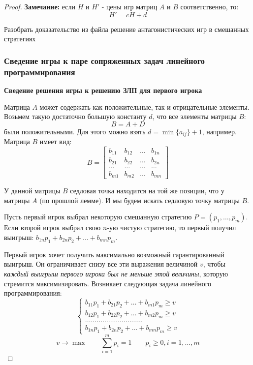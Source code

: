 \documentclass[aps,%
12pt,%
final,%
oneside,
onecolumn,%
musixtex, %
superscriptaddress,%
centertags]{article} %
\theoremstyle{plain}
\theoremstyle{definition}
\theoremstyle{remark}
\begin{document}
\begin{proof}
\textbf{Замечание:} если $H$ и $H'$ - цены игр матриц $A$ и $B$ соответственно, то:
$$H' = cH + d$$

Разобрать доказательство из файла решение антагонистических игр в смешанных стратегиях

\subsubsection{Сведение игры к паре сопряженных задач линейного программирования}

\textbf{Сведение решения игры к решению ЗЛП для первого игрока}

Матрица $A$ может содержать как положительные, так и отрицательные элементы. Возьмем такую достаточно большую константу $d$, что все элементы матрицы $B$:
$$B = A + D$$
были положительными. Для этого можно взять $d = \min \{a_{ij}\} + 1$, например. Матрица $B$ имеет вид:
$$B = \begin{bmatrix}
  b_{11} & b_{12} & \ldots & b_{1n} \\
  b_{21} & b_{22} & \ldots & b_{2n} \\
  \ldots & \ldots & \ldots & \ldots \\
  b_{m1} & b_{m2} & \ldots & b_{mn}
\end{bmatrix}$$

У данной матрицы $B$ седловая точка находится на той же позиции, что у матрицы $A$ (по прошлой лемме). И мы будем искать седловую точку матрицы $B$.

Пусть первый игрок выбрал некоторую смешанную стратегию $P = (p_1,\ldots,p_m)$. Если второй игрок выбрал свою $n$-ую чистую стратегию, то первый получил выигрыш: $b_{1n}p_1+b_{2n}p_2 + \ldots + b_{mn}p_m$.

Первый игрок хочет получить максимально возможный гарантированный выигрыш. Он ограничивает снизу все эти выражения величиной $v$, чтобы \textit{каждый выигрыш первого игрока был не меньше этой величины}, которую стремится максимизировать. Возникает следующая задача линейного программирования:
$$\begin{cases}
  b_{11}p_1+b_{21}p_2 + \ldots + b_{m1}p_m \geq v \\
  b_{12}p_1+b_{22}p_2 + \ldots + b_{m2}p_m \geq v \\
  \ldots \ldots \ldots \ldots \ldots\ldots \ldots \ldots \ldots \ldots  \\
  b_{1n}p_1+b_{2n}p_2 + \ldots + b_{mn}p_m \geq v
\end{cases}$$
$$v \to \max \qquad \sum\limits_{i=1}^m p_i = 1 \qquad p_i  \geq 0, i = 1,\ldots,m$$


\end{proof}
\end{document}
